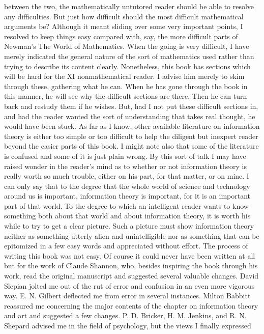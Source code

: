 between the two, the mathematically untutored reader should be
able to resolve any difficulties.
But just how difficult should the most difficult mathematical
arguments be? Although it meant sliding over some very important
points, I resolved to keep things easy compared with, say, the more
difficult parts of Newman’s The World of Mathematics. When the
going is very difficult, I have merely indicated the general nature of
the sort of mathematics used rather than trying to describe its content
clearly.
Nonetheless, this book has sections which will be hard for the
XI
nonmathematical reader. I advise him merely to skim through
these, gathering what he can. When he has gone through the book
in this manner, he will see why the difficult sections are there. Then
he can turn back and restudy them if he wishes. But, had I not
put these difficult sections in, and had the reader wanted the sort
of understanding that takes real thought, he would have been stuck.
As far as I know, other available literature on information theory
is either too simple or too difficult to help the diligent but inexpert
reader beyond the easier parts of this book. I might note also that
some of the literature is confused and some of it is just plain wrong.
By this sort of talk I may have raised wonder in the reader’s
mind as to whether or not information theory is really worth so
much trouble, either on his part, for that matter, or on mine. I can
only say that to the degree that the whole world of science and
technology around us is important, information theory is important,
for it is an important part of that world. To the degree to which an
intelligent reader wants to know something both about that world
and about information theory, it is worth his while to try to get a
clear picture. Such a picture must show information theory neither
as something utterly alien and unintelligible nor as something that
can be epitomized in a few easy words and appreciated without
effort.
The process of writing this book was not easy. Of course it could
never have been written at all but for the work of Claude Shannon,
who, besides inspiring the book through his work, read the original
manuscript and suggested several valuable changes. David Slepian
jolted me out of the rut of error and confusion in an even more
vigorous way. E. N. Gilbert deflected me from error in several
instances. Milton Babbitt reassured me concerning the major
contents of the chapter on information theory and art and suggested
a few changes. P. D. Bricker, H. M. Jenkins, and R. N. Shepard
advised me in the field of psychology, but the views I finally expressed
